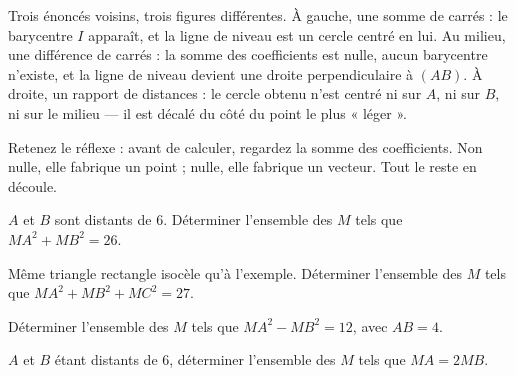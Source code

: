 \begin{visualisation}
\begin{center}
\begin{tikzpicture}[x=0.60cm, y=0.60cm, font=\footnotesize,
                    dot/.style={circle, fill, inner sep=1.2pt}]
\end{tikzpicture}
\end{center}

Trois énoncés voisins, trois figures différentes. À gauche, une somme de
carrés : le barycentre $I$ apparaît, et la ligne de niveau est un cercle
centré en lui. Au milieu, une différence de carrés : la somme des
coefficients est nulle, aucun barycentre n'existe, et la ligne de niveau
devient une droite perpendiculaire à $(AB)$. À droite, un rapport de
distances : le cercle obtenu n'est centré ni sur $A$, ni sur $B$, ni sur le
milieu — il est décalé du côté du point le plus « léger ».

Retenez le réflexe : avant de calculer, regardez la somme des coefficients.
Non nulle, elle fabrique un point ; nulle, elle fabrique un vecteur. Tout le
reste en découle.
\end{visualisation}

\begin{entrainement}
\exo[\niveau{1}] $A$ et $B$ sont distants de $6$. Déterminer l'ensemble des
$M$ tels que $MA^{2}+MB^{2} = 26$.

\exo[\niveau{2}] Même triangle rectangle isocèle qu'à l'exemple. Déterminer
l'ensemble des $M$ tels que $MA^{2}+MB^{2}+MC^{2} = 27$.

\exo[\niveau{2}] Déterminer l'ensemble des $M$ tels que
$MA^{2}-MB^{2} = 12$, avec $AB = 4$.

\exo[\niveau{3}] $A$ et $B$ étant distants de $6$, déterminer l'ensemble des
$M$ tels que $MA = 2MB$.
\end{entrainement}

